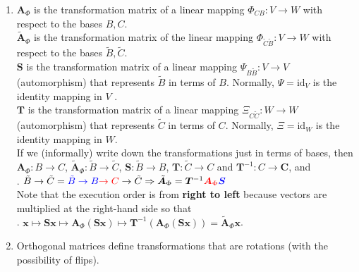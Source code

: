 \begin{enumerate}
    \item 
    $\bm{A}_\Phi$  is the transformation matrix of a linear mapping $\Phi _{CB} : V \to  W$ with respect to the bases $B, C$.
    \hfill \cite{mfml/book/mml/Deisenroth-Faisal-Ong}
    \\[0.2cm]
    $\tilde{\bm{A}}_\Phi$  is the transformation matrix of the linear mapping $\Phi_ {\tilde{C}\tilde{B}} : V \to  W$ with respect to the bases $\tilde{B}, \tilde{C}$.
    \hfill \cite{mfml/book/mml/Deisenroth-Faisal-Ong}
    \\[0.2cm]
    $\bm{S}$ is the transformation matrix of a linear mapping $\Psi _{B\tilde{B}} : V \to  V$ (automorphism) that represents $\tilde{B}$ in terms of $B$. Normally, $\Psi  = \text{id}_V$ is the identity mapping in $V$ .
    \hfill \cite{mfml/book/mml/Deisenroth-Faisal-Ong}
    \\[0.2cm]
    $\bm{T}$ is the transformation matrix of a linear mapping $\Xi _{C\tilde{C}} : W \to  W$ (automorphism) that represents $\tilde{C}$ in terms of $C$. Normally, $\Xi  = \text{id}_W$ is the identity mapping in $W$.
    \hfill \cite{mfml/book/mml/Deisenroth-Faisal-Ong}
    \\[0.2cm]
    If we (informally) write down the transformations just in terms of bases, then $\bm{A}_\Phi  : B \to  C$, $\tilde{\bm{A}}_\Phi  : \tilde{B} \to  \tilde{C}$, $\bm{S} : \tilde{B} \to  B$, $\bm{T} : \tilde{C} \to  C$ and $\bm{T}^{-1} : C \to  \bm{C}$, and
    \hfill \cite{mfml/book/mml/Deisenroth-Faisal-Ong}
    \\[0.2cm]
    .\hfill
    $
        \tilde{B} \to  \tilde{C} = \textcolor{blue}{\tilde{B} \to  B} \textcolor{red}{\to  C} \to  \tilde{C} 
        \Rightarrow
        \tilde{\bm{A}}_\Phi  = \bm{T}^{-1} \textcolor{red}{\bm{A}_\Phi} \textcolor{blue}{\bm{S}}
    $
    \hfill \cite{mfml/book/mml/Deisenroth-Faisal-Ong}
    \\[0.2cm]
    Note that the execution order is from \textbf{right to left} because vectors are multiplied at the right-hand side so that 
    \hfill \cite{mfml/book/mml/Deisenroth-Faisal-Ong}
    \\[0.2cm]
    .\hfill
    $\bm{x} \mapsto  \bm{Sx} \mapsto  \bm{A}_\Phi (\bm{Sx}) \mapsto \bm{T}^{-1}(\bm{A}_\Phi (\bm{Sx})) = \tilde{\bm{A}}_\Phi \bm{x}$.
    \hfill \cite{mfml/book/mml/Deisenroth-Faisal-Ong}

    \item  Orthogonal matrices define transformations that are rotations (with the possibility of flips).
    \hfill \cite{mfml/book/mml/Deisenroth-Faisal-Ong}
\end{enumerate}






